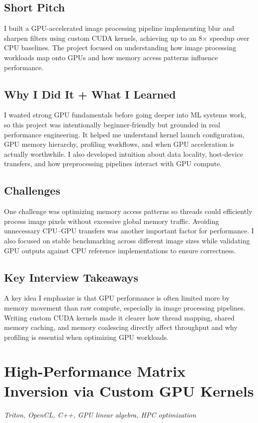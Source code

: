 \documentclass[11pt]{article}
\newcommand{\ProjectHeader}[2]{%
\section*{\textcolor{projectcolor}{#1}}%
\noindent\textit{#2}\par\vspace{0.4em}
}
\begin{document}
\subsection{Short Pitch}
I built a GPU-accelerated image processing pipeline implementing blur and sharpen filters using custom CUDA kernels, achieving up to an 8× speedup over CPU baselines. The project focused on understanding how image processing workloads map onto GPUs and how memory access patterns influence performance.

\subsection{Why I Did It + What I Learned}
I wanted strong GPU fundamentals before going deeper into ML systems work, so this project was intentionally beginner-friendly but grounded in real performance engineering. It helped me understand kernel launch configuration, GPU memory hierarchy, profiling workflows, and when GPU acceleration is actually worthwhile. I also developed intuition about data locality, host-device transfers, and how preprocessing pipelines interact with GPU compute.

\subsection{Challenges}
One challenge was optimizing memory access patterns so threads could efficiently process image pixels without excessive global memory traffic. Avoiding unnecessary CPU–GPU transfers was another important factor for performance. I also focused on stable benchmarking across different image sizes while validating GPU outputs against CPU reference implementations to ensure correctness.

\subsection{Key Interview Takeaways}
A key idea I emphasize is that GPU performance is often limited more by memory movement than raw compute, especially in image processing pipelines. Writing custom CUDA kernels made it clearer how thread mapping, shared memory caching, and memory coalescing directly affect throughput and why profiling is essential when optimizing GPU workloads.
\ProjectHeader{High-Performance Matrix Inversion via Custom GPU Kernels}{Triton, OpenCL, C++, GPU linear algebra, HPC optimization}
\end{document}
